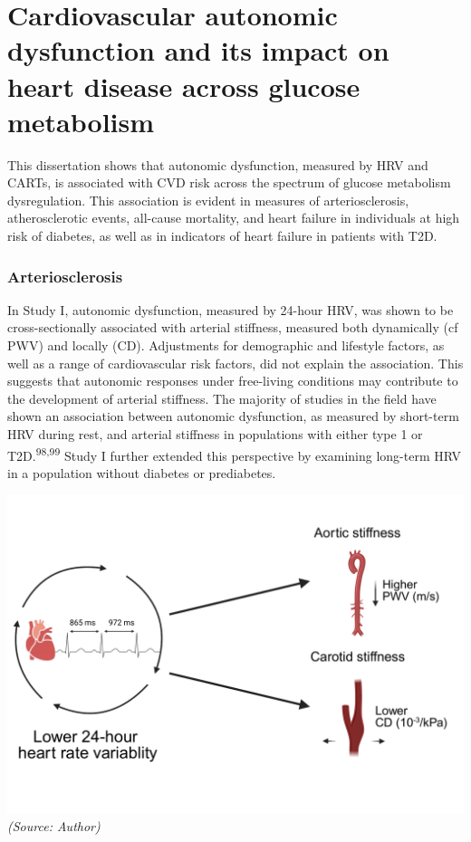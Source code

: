 \documentclass[
  letterpaper,
  headsepline=true,
  open=any]{scrbook}
\begin{document}
\hypertarget{cardiovascular-autonomic-dysfunction-and-its-impact-on-heart-disease-across-glucose-metabolism}{%
\section{Cardiovascular autonomic dysfunction and its impact on heart
disease across glucose
metabolism}\label{cardiovascular-autonomic-dysfunction-and-its-impact-on-heart-disease-across-glucose-metabolism}}

This dissertation shows that autonomic dysfunction, measured by HRV and
CARTs, is associated with CVD risk across the spectrum of glucose
metabolism dysregulation. This association is evident in measures of
arteriosclerosis, atherosclerotic events, all-cause mortality, and heart
failure in individuals at high risk of diabetes, as well as in
indicators of heart failure in patients with T2D.

\hypertarget{arteriosclerosis-1}{%
\subsubsection{Arteriosclerosis}\label{arteriosclerosis-1}}

In Study I, autonomic dysfunction, measured by 24-hour HRV, was shown to
be cross-sectionally associated with arterial stiffness, measured both
dynamically (cf PWV) and locally (CD). Adjustments for demographic and
lifestyle factors, as well as a range of cardiovascular risk factors,
did not explain the association. This suggests that autonomic responses
under free-living conditions may contribute to the development of
arterial stiffness. The majority of studies in the field have shown an
association between autonomic dysfunction, as measured by short-term HRV
during rest, and arterial stiffness in populations with either type 1 or
T2D.\textsuperscript{98,99} Study I further extended this perspective by
examining long-term HRV in a population without diabetes or prediabetes.

\includegraphics{images/hrv_arterial_stiffness.pdf} \emph{(Source:
Author)}
\end{document}
